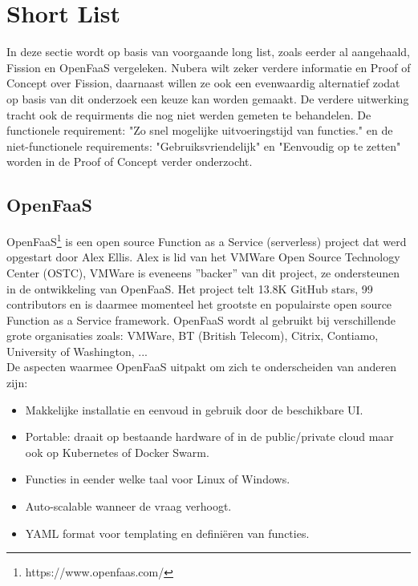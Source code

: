 \section{Short List}
\label{sec:short-list}

In deze sectie wordt op basis van voorgaande long list, zoals eerder al aangehaald, Fission en OpenFaaS vergeleken. Nubera wilt zeker verdere informatie en Proof of Concept over Fission, daarnaast willen ze ook een evenwaardig alternatief zodat op basis van dit onderzoek een keuze kan worden gemaakt. De verdere uitwerking tracht ook de requirments die nog niet werden gemeten te behandelen. De functionele requirement: "Zo snel mogelijke uitvoeringstijd van functies." en de niet-functionele requirements: "Gebruiksvriendelijk" en "Eenvoudig op te zetten" worden in de Proof of Concept verder onderzocht. 

\subsection{OpenFaaS}
OpenFaaS\footnote{https://www.openfaas.com/} is een open source Function as a Service (serverless) project dat werd opgestart door Alex Ellis. Alex is lid van het VMWare Open Source Technology Center (OSTC), VMWare is eveneens ''backer'' van dit project, ze ondersteunen in de ontwikkeling van OpenFaaS. Het project telt 13.8K GitHub stars, 99 contributors en is daarmee momenteel het grootste en populairste open source Function as a Service framework. OpenFaaS wordt al gebruikt bij verschillende grote organisaties zoals: VMWare, BT (British Telecom), Citrix, Contiamo, University of Washington, ... 
\\
De aspecten waarmee OpenFaaS uitpakt om zich te onderscheiden van anderen zijn: \autocite{OpenFaaS2019}
\begin{itemize}
    \item Makkelijke installatie en eenvoud in gebruik door de beschikbare UI.
    \item Portable: draait op bestaande hardware of in de public/private cloud maar ook op Kubernetes of Docker Swarm.
    \item Functies in eender welke taal voor Linux of Windows.
    \item Auto-scalable wanneer de vraag verhoogt.
    \item YAML format voor templating en definiëren van functies.
\end{itemize}
